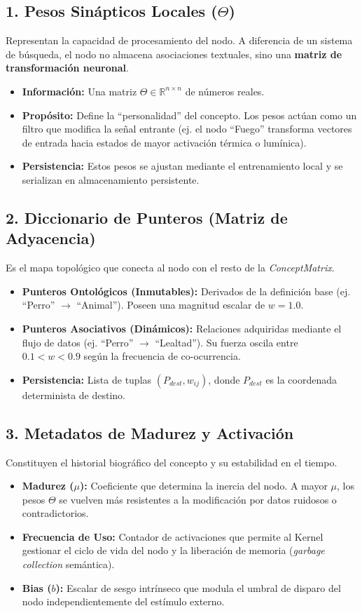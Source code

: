 \documentclass[12pt]{article}
\begin{document}
\subsection{1. Pesos Sinápticos Locales ($\Theta$)}
Representan la capacidad de procesamiento del nodo. A diferencia de un sistema de búsqueda, el nodo no almacena asociaciones textuales, sino una \textbf{matriz de transformación neuronal}.
\begin{itemize}
    \item \textbf{Información:} Una matriz $\Theta \in \mathbb{R}^{n \times n}$ de números reales.
    \item \textbf{Propósito:} Define la ``personalidad'' del concepto. Los pesos actúan como un filtro que modifica la señal entrante (ej. el nodo ``Fuego'' transforma vectores de entrada hacia estados de mayor activación térmica o lumínica).
    \item \textbf{Persistencia:} Estos pesos se ajustan mediante el entrenamiento local y se serializan en almacenamiento persistente.
\end{itemize}

\subsection{2. Diccionario de Punteros (Matriz de Adyacencia)}
Es el mapa topológico que conecta al nodo con el resto de la \textit{ConceptMatrix}.
\begin{itemize}
    \item \textbf{Punteros Ontológicos (Inmutables):} Derivados de la definición base (ej. ``Perro'' $\rightarrow$ ``Animal''). Poseen una magnitud escalar de $w = 1.0$.
    \item \textbf{Punteros Asociativos (Dinámicos):} Relaciones adquiridas mediante el flujo de datos (ej. ``Perro'' $\rightarrow$ ``Lealtad''). Su fuerza oscila entre $0.1 < w < 0.9$ según la frecuencia de co-ocurrencia.
    \item \textbf{Persistencia:} Lista de tuplas $(P_{dest}, w_{ij})$, donde $P_{dest}$ es la coordenada determinista de destino.
\end{itemize}

\subsection{3. Metadatos de Madurez y Activación}
Constituyen el historial biográfico del concepto y su estabilidad en el tiempo.
\begin{itemize}
    \item \textbf{Madurez ($\mu$):} Coeficiente que determina la inercia del nodo. A mayor $\mu$, los pesos $\Theta$ se vuelven más resistentes a la modificación por datos ruidosos o contradictorios.
    \item \textbf{Frecuencia de Uso:} Contador de activaciones que permite al Kernel gestionar el ciclo de vida del nodo y la liberación de memoria (\textit{garbage collection} semántica).
    \item \textbf{Bias ($b$):} Escalar de sesgo intrínseco que modula el umbral de disparo del nodo independientemente del estímulo externo.
\end{itemize}
\end{document}

